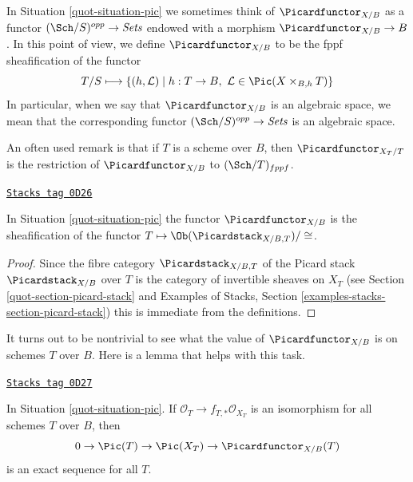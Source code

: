 In Situation \ref{quot-situation-pic} we sometimes think of
$\Picardfunctor_{X/B}$ as a functor $(\Sch/S)^{opp} \to \textit{Sets}$
endowed with a morphism $\Picardfunctor_{X/B} \to B$. In this point
of view, we define $\Picardfunctor_{X/B}$ to be the fppf sheafification of
the functor
$$
T/S \longmapsto \{(h, \mathcal{L}) \mid
h : T \to B,\ \mathcal{L} \in \Pic(X \times_{B, h} T)\}
$$
In particular, when we say that $\Picardfunctor_{X/B}$ is an algebraic space,
we mean that the corresponding functor
$(\Sch/S)^{opp} \to \textit{Sets}$ is an algebraic space.

\medskip\noindent
An often used remark is that if $T$ is a scheme over $B$, then
$\Picardfunctor_{X_T/T}$ is the restriction of $\Picardfunctor_{X/B}$ to
$(\Sch/T)_{fppf}$.

\begin{lemma}
\label{quot-lemma-pic-over-pic}
\href{https://stacks.math.columbia.edu/tag/0D26}{\texttt{Stacks tag 0D26}}

In Situation \ref{quot-situation-pic}
the functor $\Picardfunctor_{X/B}$ is the sheafification of
the functor $T \mapsto \Ob(\Picardstack_{X/B, T})/\cong$.
\end{lemma}

\begin{proof}
Since the fibre category $\Picardstack_{X/B, T}$ of the Picard stack
$\Picardstack_{X/B}$ over $T$ is the category of invertible sheaves on
$X_T$ (see Section \ref{quot-section-picard-stack} and
Examples of Stacks, Section \ref{examples-stacks-section-picard-stack})
this is immediate from the definitions.
\end{proof}

It turns out to be nontrivial to see what the value of $\Picardfunctor_{X/B}$
is on schemes $T$ over $B$. Here is a lemma that helps with this task.

\begin{lemma}
\label{quot-lemma-flat-geometrically-connected-fibres}
\href{https://stacks.math.columbia.edu/tag/0D27}{\texttt{Stacks tag 0D27}}

In Situation \ref{quot-situation-pic}.
If $\mathcal{O}_T \to f_{T, *}\mathcal{O}_{X_T}$ is an isomorphism
for all schemes $T$ over $B$, then
$$
0 \to \Pic(T) \to \Pic(X_T) \to \Picardfunctor_{X/B}(T)
$$
is an exact sequence for all $T$.
\end{lemma}

